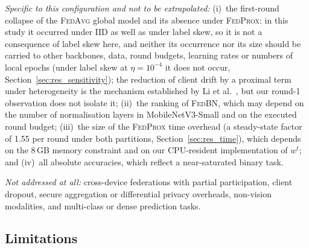 \documentclass[journal]{IEEEtran}
\newcommand{\fedavg}{\textsc{FedAvg}}
\newcommand{\fedprox}{\textsc{FedProx}}
\newcommand{\fedbn}{\textsc{FedBN}}
\begin{document}
\emph{Specific to this configuration and not to be extrapolated:} (i)~the first-round collapse of the \fedavg{} global model and its absence under \fedprox{}: in this study it occurred under IID as well as under label skew, so it is not a consequence of label skew here, and neither its occurrence nor its size should be carried to other backbones, data, round budgets, learning rates or numbers of local epochs (under label skew at $\eta=10^{-4}$ it does not occur, Section~\ref{sec:res_sensitivity}); the reduction of client drift by a proximal term under heterogeneity is the mechanism established by Li et al.~\cite{li2020fedprox}, but our round-1 observation does not isolate it; (ii)~the ranking of \fedbn{}, which may depend on the number of normalisation layers in MobileNetV3-Small and on the executed round budget; (iii)~the size of the \fedprox{} time overhead (a steady-state factor of 1.55 per round under both partitions, Section~\ref{sec:res_time}), which depends on the 8\,GB memory constraint and on our CPU-resident implementation of $w^t$; and (iv)~all absolute accuracies, which reflect a near-saturated binary task.

\emph{Not addressed at all:} cross-device federations with partial participation, client dropout, secure aggregation or differential privacy overheads, non-vision modalities, and multi-class or dense prediction tasks.

\subsection{Limitations}
\label{sec:limitations}
\end{document}
